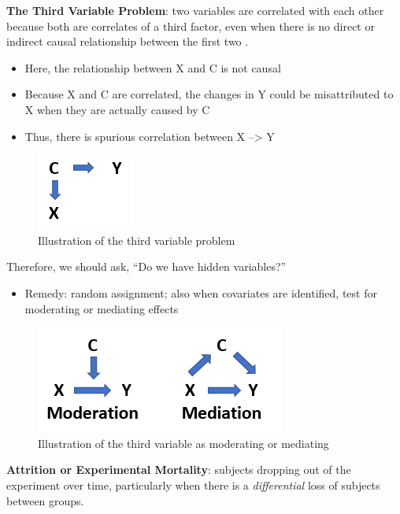 \documentclass[
  english,
]{book}
\providecommand{\tightlist}{%
  \setlength{\itemsep}{0pt}\setlength{\parskip}{0pt}}
\begin{document}
\textbf{The Third Variable Problem}: two variables are correlated with each other because both are correlates of a third factor, even when there is no direct or indirect causal relationship between the first two \citep{reis_research_2000}.

\begin{itemize}
\tightlist
\item
  Here, the relationship between X and C is not causal
\item
  Because X and C are correlated, the changes in Y could be misattributed to X when they are actually caused by C
\item
  Thus, there is spurious correlation between X --\textgreater{} Y
\end{itemize}

\begin{figure}
\centering
\includegraphics{images/Experiment/ThirdVariable.png}
\caption{Illustration of the third variable problem}
\end{figure}

Therefore, we should ask, ``Do we have hidden variables?''

\begin{itemize}
\tightlist
\item
  Remedy: random assignment; also when covariates are identified, test for moderating or mediating effects
\end{itemize}

\begin{figure}
\centering
\includegraphics{images/Experiment/ModMed.png}
\caption{Illustration of the third variable as moderating or mediating}
\end{figure}

\textbf{Attrition or Experimental Mortality}: subjects dropping out of the experiment over time, particularly when there is a \emph{differential} loss of subjects between groups.
\end{document}
